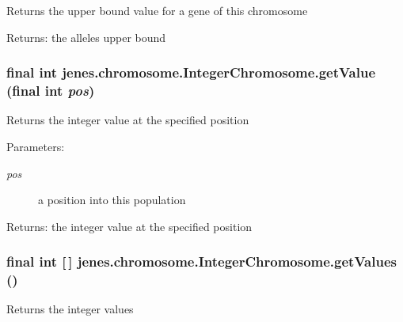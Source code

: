 Returns the upper bound value for a gene of this chromosome

\begin{Desc}
\item[Returns:]the alleles upper bound \end{Desc}
\hypertarget{classjenes_1_1chromosome_1_1_integer_chromosome_5bc96e2224ca980bd9e13e0416426e1d}{
\subsubsection[getValue]{\setlength{\rightskip}{0pt plus 5cm}final int jenes.chromosome.IntegerChromosome.getValue (final int {\em pos})}}
\label{classjenes_1_1chromosome_1_1_integer_chromosome_5bc96e2224ca980bd9e13e0416426e1d}


Returns the integer value at the specified position 

\begin{Desc}
\item[Parameters:]
\begin{description}
\item[{\em pos}]a position into this population \end{description}
\end{Desc}
\begin{Desc}
\item[Returns:]the integer value at the specified position \end{Desc}
\hypertarget{classjenes_1_1chromosome_1_1_integer_chromosome_a9e195726837440d8b65c9fc4268624c}{
\subsubsection[getValues]{\setlength{\rightskip}{0pt plus 5cm}final int \mbox{[}$\,$\mbox{]} jenes.chromosome.IntegerChromosome.getValues ()}}
\label{classjenes_1_1chromosome_1_1_integer_chromosome_a9e195726837440d8b65c9fc4268624c}


Returns the integer values 

